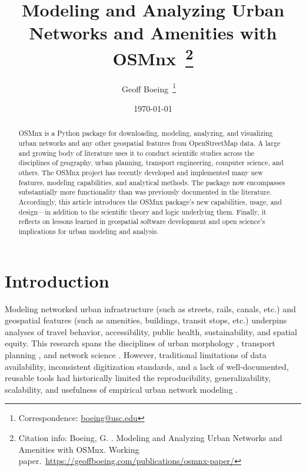 \documentclass[12pt,letterpaper]{article} %
\makeatletter
\newcommand{\myname}{Geoff Boeing}
\newcommand{\myemail}{boeing@usc.edu}
\newcommand{\myaffiliation}{University of Southern California}
\newcommand{\paperdate}{\monthyeardate\today}
\newcommand{\papertitle}{Modeling and Analyzing Urban Networks and Amenities with OSMnx}
\newcommand{\papercitation}{Boeing, G. \the\year. \papertitle. Working paper.\ \href{https://geoffboeing.com/publications/osmnx-paper/}{https://geoffboeing.com/publications/osmnx-paper/}}
\makeatother
\begin{document}
\title{\papertitle~\footnote{Citation info: \papercitation}}
\author[]{\myname~\footnote{Correspondence: \href{mailto:\myemail}{\myemail}}~~}
\affil[]{\myaffiliation}
\date{\paperdate}

\maketitle

\begin{abstract}

OSMnx is a Python package for downloading, modeling, analyzing, and visualizing urban networks and any other geospatial features from OpenStreetMap data. A large and growing body of literature uses it to conduct scientific studies across the disciplines of geography, urban planning, transport engineering, computer science, and others. The OSMnx project has recently developed and implemented many new features, modeling capabilities, and analytical methods. The package now encompasses substantially more functionality than was previously documented in the literature. Accordingly, this article introduces the OSMnx package's new capabilities, usage, and design---in addition to the scientific theory and logic underlying them. Finally, it reflects on lessons learned in geospatial software development and open science's implications for urban modeling and analysis.

\end{abstract}

\section{Introduction}

Modeling networked urban infrastructure (such as streets, rails, canals, etc.) and geospatial features (such as amenities, buildings, transit stops, etc.) underpins analyses of travel behavior, accessibility, public health, sustainability, and spatial equity. This research spans the disciplines of urban morphology \citep[e.g.,][]{gervasoni_calculating_2017,dacci_signature_2019,coutrot_entropy_2022}, transport planning \citep[e.g.,][]{merchan_quantifying_2020,liao_disparities_2020,natera_orozco_data-driven_2020}, and network science \citep[e.g.,][]{feng_spatial_2020,yin_multi-task_2020,young_automatic_2020}. However, traditional limitations of data availability, inconsistent digitization standards, and a lack of well-documented, reusable tools had historically limited the reproducibility, generalizability, scalability, and usefulness of empirical urban network modeling \citep{liu_generalized_2022}.
\end{document}
